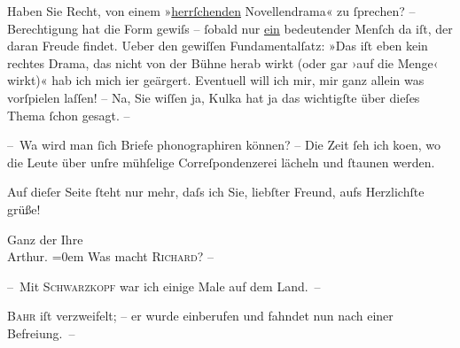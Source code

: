\pstart
           Haben Sie Recht, von einem »\uline{herrſchenden}
               Novellendrama« zu{ }ſprechen? – Berechtigung hat die Form gewiſs –{ }ſobald nur \uline{ein} bedeutender Menſch da iſt, der daran Freude
               findet. Ueber den gewiſſen Fundamentalſatz: »Das iſt eben kein rechtes Drama, das
               nicht von der Bühne herab wirkt (oder gar ›auf die Menge‹ wirkt)« hab ich {\pb}mich i{\geminationm}er geärgert. Eventuell will ich mir, mir ganz allein
               was vorſpielen laſſen! – Na, Sie wiſſen ja, Kulka hat ja das wichtigſte über dieſes Thema{ }ſchon gesagt. –\pend
           
\pstart
           – Wa{\geminationn} wird man{ }ſich Briefe phonographiren können? – Die
               Zeit{ }ſeh ich ko{\geminationm}en, wo die Leute über unſre mühſelige
               Correſpondenzerei lächeln und{ }ſtaunen werden.\pend
           
\pstart
           {\pb}Auf dieſer Seite{ }ſteht nur mehr, daſs ich Sie, liebſter
               Freund, aufs Herzlichſte grüße!\pend
           
\pstart
           Ganz der Ihre{\\[\baselineskip]}\spacefill\mbox{Arthur.}\pend
           \leftskip=0em{}
\pstart
           \noindent{}Was macht \textsc{Richard}? –\pend
           
\pstart
           – Mit \textsc{Schwarzkopf} war ich einige Male auf dem Land. –\pend
           
\pstart
           \textsc{Bahr} iſt verzweifelt; – er wurde einberufen und fahndet nun nach einer
                  Befreiung. –\pend
           \endnumbering{}  \newcommand{\dateiname}{L00112}\newcommand{\titel}{Arthur Schnitzler an Hugo von Hofmannsthal, [6. 8. 1892]}\newcommand{\editorInnen}{Herausgegeben von Martin Anton Müller}
